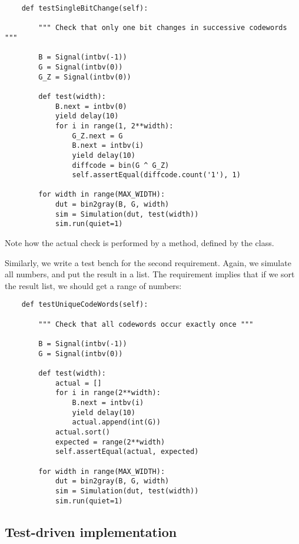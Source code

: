 \begin{verbatim}
    def testSingleBitChange(self):
        
        """ Check that only one bit changes in successive codewords """

        B = Signal(intbv(-1))
        G = Signal(intbv(0))
        G_Z = Signal(intbv(0))
        
        def test(width):
            B.next = intbv(0)
            yield delay(10)
            for i in range(1, 2**width):
                G_Z.next = G
                B.next = intbv(i)
                yield delay(10)
                diffcode = bin(G ^ G_Z)
                self.assertEqual(diffcode.count('1'), 1)
        
        for width in range(MAX_WIDTH):
            dut = bin2gray(B, G, width)
            sim = Simulation(dut, test(width))
            sim.run(quiet=1)

\end{verbatim}
Note how the actual check is performed by a 
method, defined by the  class.

Similarly, we write a test bench for the second requirement. Again, we
simulate all numbers, and put the result in a list. The requirement
implies that if we sort the result list, we should get a range of
numbers:

\begin{verbatim}
    def testUniqueCodeWords(self):
        
        """ Check that all codewords occur exactly once """

        B = Signal(intbv(-1))
        G = Signal(intbv(0))

        def test(width):
            actual = []
            for i in range(2**width):
                B.next = intbv(i)
                yield delay(10)
                actual.append(int(G))
            actual.sort()
            expected = range(2**width)
            self.assertEqual(actual, expected)
       
        for width in range(MAX_WIDTH):
            dut = bin2gray(B, G, width)
            sim = Simulation(dut, test(width))
            sim.run(quiet=1)

\end{verbatim}


\subsection{Test-driven implementation}

